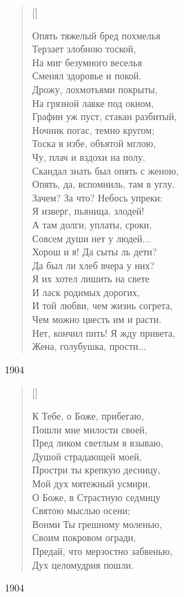 \settowidth{\versewidth}{Опять тяжелый бред похмелья}
\begin{verse}[\versewidth]
\begin{altverse}
Опять тяжелый бред похмелья\\
Терзает злобною тоской,\\
На миг безумного веселья\\
Сменял здоровье и покой.\\
Дрожу, лохмотьями покрыты,\\
На грязной лавке под окном,\\
Графин уж пуст, стакан разбитый,\\
Ночник погас, темно кругом;\\
Тоска в избе, объятой мглою,\\
Чу, плач и вздохи на полу.\\
Скандал знать был опять с женою,\\
Опять, да, вспомниль, там в углу.\\
Зачем? За что? Небось упреки:\\
Я изверг, пьяница, злодей!\\
А там долги, уплаты, сроки,\\
Совсем души нет у людей...\\
Хорош и я! Да сыты ль дети?\\
Да был ли хлеб вчера у них?\\
Я их хотел лишить на свете\\
И ласк родимых дорогих,\\
И той любви, чем жизнь согрета,\\
Чем можно цвесть им и расти.\\
Нет, кончил пить! Я жду привета,\\
Жена, голубушка, прости...
\end{altverse}
\end{verse}
1904

\settowidth{\versewidth}{Пред ликом светлым я взываю}
\begin{verse}[\versewidth]
\begin{altverse}
К Тебе, о Боже, прибегаю,\\
Пошли мне милости своей,\\
Пред ликом светлым я взываю,\\
Душой страдающей моей,\\
Простри ты крепкую десницу,\\
Мой дух мятежный усмири,\\
О Боже, в Страстную седмицу\\
Святою мыслью осени;\\
Вонми Ты грешному моленью,\\
Своим покровом огради,\\
Предай, что мерзостно забвенью,\\
Дух целомудрия пошли.
\end{altverse}
\end{verse}
1904



